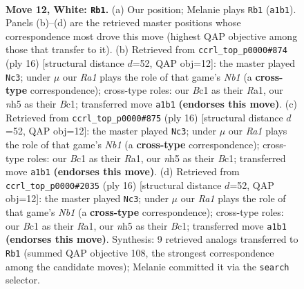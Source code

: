 \documentclass[11pt]{article}
\begin{document}
\clearpage

\begin{figure}[p]\centering
\begin{subfigure}{0.46\textwidth}\centering
\resizebox{\linewidth}{!}{%
\newchessgame
\chessboard[
  setfen={rn1q1rk1/pp1b1ppp/4p3/2P4n/2P5/3BPN2/P4PPP/R1BQ1RK1 w - - 1 12},
  showmover=false,
  pgfstyle=straightmove, color=movearrow, markmove={a1-b1}
]}
\caption{}
\end{subfigure}\hfill
\begin{subfigure}{0.46\textwidth}\centering
\resizebox{\linewidth}{!}{%
\newchessgame
\chessboard[
  setfen={rnbq1rk1/pp2ppbp/6p1/3n4/3N4/6P1/PP2PPBP/RNBQ1RK1 w - - 0 9},
  showmover=false,
  pgfstyle=straightmove, color=movearrow, markmove={b1-c3}
]}
\caption{}
\end{subfigure}
\\[4pt]
\begin{subfigure}{0.46\textwidth}\centering
\resizebox{\linewidth}{!}{%
\newchessgame
\chessboard[
  setfen={rnbq1rk1/pp2ppbp/6p1/3n4/3N4/6P1/PP2PPBP/RNBQ1RK1 w - - 0 9},
  showmover=false,
  pgfstyle=straightmove, color=movearrow, markmove={b1-c3}
]}
\caption{}
\end{subfigure}\hfill
\begin{subfigure}{0.46\textwidth}\centering
\resizebox{\linewidth}{!}{%
\newchessgame
\chessboard[
  setfen={rnbq1rk1/pp2ppbp/6p1/3n4/3N4/6P1/PP2PPBP/RNBQ1RK1 w - - 0 9},
  showmover=false,
  pgfstyle=straightmove, color=movearrow, markmove={b1-c3}
]}
\caption{}
\end{subfigure}
\caption{\textbf{Move 12, White: \texttt{Rb1}.} (a) Our position; Melanie plays \texttt{Rb1} (\texttt{a1b1}). Panels (b)--(d) are the retrieved master positions whose correspondence most drove this move (highest QAP objective among those that transfer to it). (b) Retrieved from \texttt{ccrl\_top\_p0000\#874} (ply 16) [structural distance $d$=52, QAP obj=12]: the master played \texttt{Nc3}; under $\mu$ our \emph{Ra1} plays the role of that game's \emph{Nb1} (a \textbf{cross-type} correspondence); cross-type roles: our \emph{B}c1 as their \emph{R}a1, our \emph{n}h5 as their \emph{B}c1; transferred move \texttt{a1b1} \textbf{(endorses this move)}. (c) Retrieved from \texttt{ccrl\_top\_p0000\#875} (ply 16) [structural distance $d$=52, QAP obj=12]: the master played \texttt{Nc3}; under $\mu$ our \emph{Ra1} plays the role of that game's \emph{Nb1} (a \textbf{cross-type} correspondence); cross-type roles: our \emph{B}c1 as their \emph{R}a1, our \emph{n}h5 as their \emph{B}c1; transferred move \texttt{a1b1} \textbf{(endorses this move)}. (d) Retrieved from \texttt{ccrl\_top\_p0000\#2035} (ply 16) [structural distance $d$=52, QAP obj=12]: the master played \texttt{Nc3}; under $\mu$ our \emph{Ra1} plays the role of that game's \emph{Nb1} (a \textbf{cross-type} correspondence); cross-type roles: our \emph{B}c1 as their \emph{R}a1, our \emph{n}h5 as their \emph{B}c1; transferred move \texttt{a1b1} \textbf{(endorses this move)}. Synthesis: 9 retrieved analogs transferred to \texttt{Rb1} (summed QAP objective 108, the strongest correspondence among the candidate moves); Melanie committed it via the \texttt{search} selector.}
\label{fig:thought-m22}
\end{figure}
\end{document}
